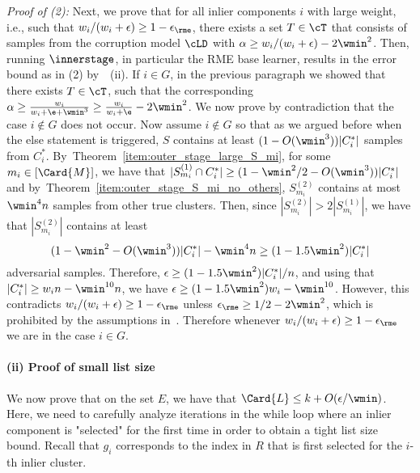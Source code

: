 \emph{Proof of (2):}
Next, we prove that for all inlier components $i$ with large weight, i.e., such that 
$w_i/(w_i+\epsilon) \geq 1 - \epsilon_{\rme}$, there exists a set  \(T \in \cT\) that consists of samples from the corruption model \(\cLD\) with $\alpha \geq w_i/(w_i+\epsilon)-2\wmin^2$.
Then, running \(\innerstage\), in particular the RME base learner, results in the error bound as in (2) by~~(ii).
If \(i \in G\), in the previous paragraph we showed that there exists \(T \in \cT\), such that the corresponding \(\alpha \geq \frac{w_i}{w_i + \e + \wmin^3} \geq \frac{w_i}{w_i + \e} - 2\wmin^2\). 
We now prove by contradiction that the case \(i \notin G\) does not occur.
Now assume \(i \notin G\) so that as we argued before
when the else statement is triggered, $S$ contains at least $(1-O(\wmin^3)) |C^*_i|$ samples from $C^*_i$.
By~Theorem~\ref{item:outer_stage_large_S_mi}, 
for some \(m_i \in [\Card{M}]\), we have that $|S_{m_i}^{(1)} \cap C^*_i| \geq (1-\wmin^2/2-O(\wmin^3))|C^*_i|$ and by~Theorem~\ref{item:outer_stage_S_mi_no_others}, $S_{m_i}^{(2)}$ contains at most $\wmin^{4}n$ samples from other true clusters.
Then, since $|S_{m_i}^{(2)}| > 2|S_{m_i}^{(1)}|$, we have that $|S_{m_i}^{(2)}|$ contains at least 
\[(1-\wmin^2-O(\wmin^3))|C^*_i|-\wmin^4n \geq (1-1.5\wmin^2)|C^*_i|\] 
adversarial samples.
Therefore, $\epsilon \geq (1-1.5\wmin^2)|C^*_i|/n$, and using that $|C^*_i| \geq w_i n-\wmin^{10}n$, we have $\epsilon \geq (1-1.5\wmin^2)w_i - \wmin^{10}$.
However, this contradicts $w_i / (w_i+\epsilon) \geq 1-\epsilon_{\rme}$ unless $\epsilon_{\rme} \geq 1/2-2\wmin^2$, which is prohibited by the assumptions in~. Therefore whenever $w_i/(w_i+\epsilon) \geq 1 - \epsilon_{\rme}$ we are in the case $i \in G$.

\paragraph{(ii) Proof of small list size}
We now prove that on the set $E$, 
we have that $\Card{L} \leq k+O(\epsilon/ \wmin)$.
Here, we need to carefully analyze iterations in the while loop where an inlier component is "selected" for the first time in order to obtain a tight list size bound. Recall that \(g_i\) corresponds to the index in \(R\) that is first selected for the \(i\)-th inlier cluster. \\


